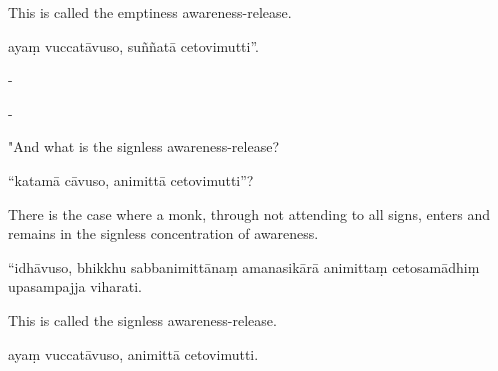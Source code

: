 \begin{samepage}
\begin{leftcolumn*}
This is called the emptiness awareness-release.
\end{leftcolumn*}

\begin{rightcolumn}
ayaṃ vuccatāvuso, suññatā cetovimutti”.
\end{rightcolumn}
\end{samepage}

\begin{samepage}
\begin{leftcolumn*}
-
\end{leftcolumn*}

\begin{rightcolumn}
-
\end{rightcolumn}
\end{samepage}

\begin{samepage}
\begin{leftcolumn*}
"And what is the signless awareness-release?
\end{leftcolumn*}

\begin{rightcolumn}
“katamā cāvuso, animittā cetovimutti”?
\end{rightcolumn}
\end{samepage}

\begin{samepage}
\begin{leftcolumn*}
There is the case where a monk, through not attending to all signs, enters and remains in the signless concentration of awareness.
\end{leftcolumn*}

\begin{rightcolumn}
“idhāvuso, bhikkhu sabbanimittānaṃ amanasikārā animittaṃ cetosamādhiṃ upasampajja viharati.
\end{rightcolumn}
\end{samepage}

\begin{samepage}
\begin{leftcolumn*}
This is called the signless awareness-release.
\end{leftcolumn*}

\begin{rightcolumn}
ayaṃ vuccatāvuso, animittā cetovimutti.
\end{rightcolumn}
\end{samepage}

